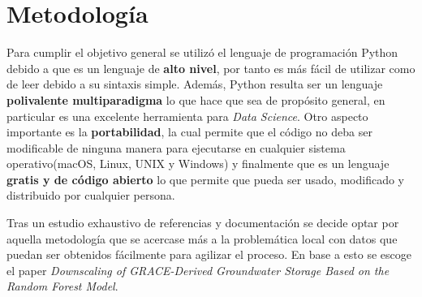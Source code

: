 \chapter{Metodología}
\label{C3}
Para cumplir el objetivo general se utilizó el lenguaje de programación Python debido a que es un lenguaje de \textbf{alto nivel}, por tanto es más fácil de utilizar como de leer debido a su sintaxis simple.
Además, Python resulta ser un lenguaje \textbf{polivalente multiparadigma} lo que hace que sea de propósito general, en particular es una excelente herramienta para \textit{Data Science}. Otro aspecto importante es la
\textbf{portabilidad}, la cual permite que el código no deba ser modificable de ninguna manera para ejecutarse en cualquier sistema operativo(macOS, Linux, UNIX y Windows) y finalmente que es un lenguaje
\textbf{gratis y de código abierto} lo que permite que pueda ser usado, modificado y distribuido por cualquier persona.

Tras un estudio exhaustivo de referencias y documentación se decide optar por aquella metodología
que se acercase más a la problemática local con datos que puedan ser obtenidos fácilmente para agilizar
el proceso. En base a esto se escoge el paper \textit{Downscaling of GRACE-Derived Groundwater Storage
Based on the Random Forest Model}\cite{11}.

